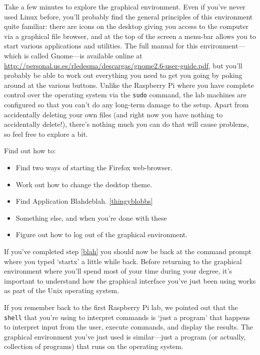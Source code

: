 Take a few minutes to explore the graphical environment. Even if you've never used Linux before, you'll probably find the general principles of this environment quite familiar: there are icons on the desktop giving you access to the computer via a graphical file browser, and at the top of the screen a menu-bar allows you to start various applications and utilities. The full manual for this environment---which is called Gnome---is available online at \url{http://personal.us.es/rledesma/descargas/gnome2.6-user-guide.pdf}, but you'll probably be able to work out everything you need to get you going by poking around at the various buttons. Unlike the Raspberry Pi where you have complete control over the operating system via the \texttt{sudo} command, the lab machines are configured so that you can't do any long-term damage to the setup. Apart from accidentally deleting your own files (and right now you have nothing to accidentally delete!), there's nothing much you can do that will cause problems, so feel free to explore a bit. 

Find out how to:
\begin{itemize}
\item Find two ways of starting the Firefox web-browser.
\item Work out how to change the desktop theme. 
\item Find Application Blahdeblah. \ref{thingyblobbs}
\item Something else, and when you're done with these
\item Figure out how to log out of the graphical environment.
\end{itemize}

If you've completed step \ref{blah} you should now be back at the command prompt where you typed `startx' a little while back. Before returning to the graphical environment where you'll spend most of your time during your degree, it's important to understand how the graphical interface you've just been using works as part of the Unix operating system. 

If you remember back to the first Raspberry Pi lab, we pointed out that the \texttt{shell} that you're using to interpret commands is `just a program' that happens to interpret input from the user, execute commands, and display the results. The graphical environment you've just used is similar---just a program (or actually, collection of programs) that runs on the operating system.

